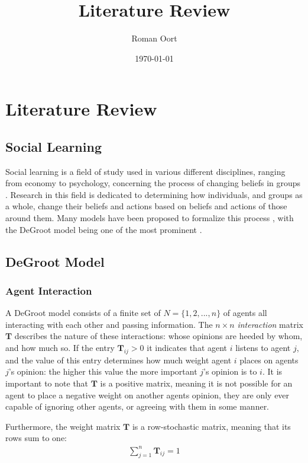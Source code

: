 \documentclass{article}
\title{Literature Review}
\author{Roman Oort}
\date{\today}
\newcommand{\T}{\textbf{T}}
\newcommand{\Tij}{\textbf{T}_{ij}}
\begin{document}
\maketitle

\tableofcontents

\newpage

\section{Literature Review}
\subsection{Social Learning}
Social learning is a field of study used in various different disciplines, ranging from economy to psychology, concerning the process of changing beliefs in groups \cite{reed2010sociallearning}. Research in this field is dedicated to determining how individuals, and groups as a whole, change their beliefs and actions based on beliefs and actions of those around them. Many models have been proposed to formalize this process \cite{golub2017learning}, with the DeGroot model being one of the most prominent \cite{degroot1974concensus}.

\subsection{DeGroot Model}
\subsubsection{Agent Interaction}
A DeGroot model consists of a finite set of $N=\{1, 2, ..., n\}$ of agents all interacting with each other and passing information. The $n \times n$ \emph{interaction} matrix $\T$ describes the nature of these interactions: whose opinions are heeded by whom, and how much so. If the entry $\Tij > 0$ it indicates that agent $i$ listens to agent $j$, and the value of this entry determines how much weight agent $i$ places on agents $j$'s opinion: the higher this value the more important $j$'s opinion is to $i$. It is important to note that $\T$ is a positive matrix, meaning it is not possible for an agent to place a negative weight on another agents opinion, they are only ever capable of ignoring other agents, or agreeing with them in some manner. 

Furthermore, the weight matrix $\T$ is a row-stochastic matrix, meaning that its rows sum to one:
\begin{align*}
    \sum_{j=1}^{n} \Tij = 1
\end{align*}
\end{document}
